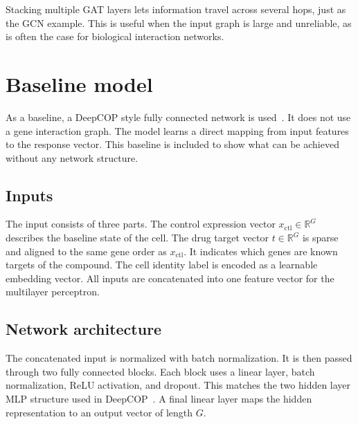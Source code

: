 \noindent Stacking multiple GAT layers lets information travel across several hops, just as the GCN example. This is useful when the input graph is large and unreliable, as is often the case for biological interaction networks.





\section{Baseline model}
As a baseline, a DeepCOP style fully connected network is used~\cite{woo2020deepcop}. It does not use a gene interaction graph. The model learns a direct mapping from input features to the response vector. This baseline is included to show what can be achieved without any network structure.

\subsection{Inputs}
The input consists of three parts. The control expression vector $x_{\mathrm{ctl}}\in\mathbb{R}^{G}$ describes the baseline state of the cell. The drug target vector $t\in\mathbb{R}^{G}$ is sparse and aligned to the same gene order as $x_{\mathrm{ctl}}$. It indicates which genes are known targets of the compound. The cell identity label is encoded as a learnable embedding vector. All inputs are concatenated into one feature vector for the multilayer perceptron.

\subsection{Network architecture}
The concatenated input is normalized with batch normalization. It is then passed through two fully connected blocks. Each block uses a linear layer, batch normalization, ReLU activation, and dropout. This matches the two hidden layer MLP structure used in DeepCOP~\cite{woo2020deepcop}. A final linear layer maps the hidden representation to an output vector of length $G$.

